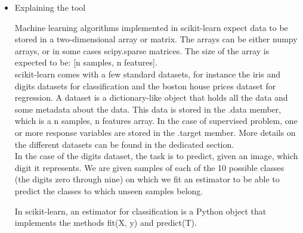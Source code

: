 \begin{itemize}
\item{Explaining the tool}

\tab Machine learning algorithms implemented in scikit-learn expect data to be stored in a two-dimensional array or matrix. The arrays can be either numpy arrays, or in some cases scipy.sparse matrices. The size of the array is expected to be: [n samples, n features]. \\ 

\tab scikit-learn comes with a few standard datasets, for instance the iris and digits datasets for classification and the boston house prices dataset for regression. A dataset is a dictionary-like object that holds all the data and some metadata about the data. This data is stored in the .data member, which is a n samples, n features array. In the case of supervised problem, one or more response variables are stored in the .target member. More details on the different datasets can be found in the dedicated section.\\

\tab In the case of the digits dataset, the task is to predict, given an image, which digit it represents. We are given samples of each of the 10 possible classes (the digits zero through nine) on which we fit an estimator to be able to predict the classes to which unseen samples belong.

In scikit-learn, an estimator for classification is a Python object that implements the methods fit(X, y) and predict(T).\\

\end{itemize}